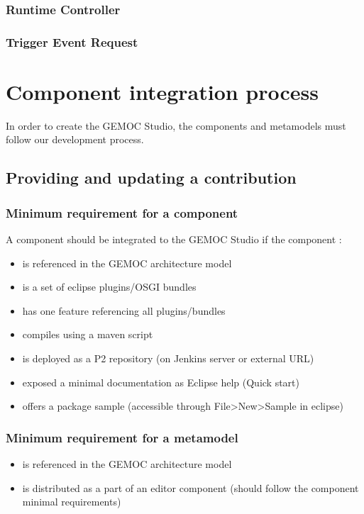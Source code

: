 \documentclass{gemoc} %
\begin{document}

\subsection{Runtime Controller}
\label{sec:Runtime_Controller}


\subsection{Trigger Event Request}
\label{sec:Trigger_Event_Request}



\chapter{Component integration process}
In  order to create the GEMOC Studio, the components and metamodels must follow our development process.

\section{Providing and updating a contribution}
\subsection{Minimum requirement for a component}
A component should be integrated to the GEMOC Studio if the component :
\begin{itemize}
	\item is referenced in the GEMOC architecture model
	\item is a set of eclipse plugins/OSGI bundles
	\item has one feature referencing all plugins/bundles
	\item compiles using a maven script
	\item is deployed as a P2 repository (on Jenkins server or external URL)
	\item exposed a minimal documentation as Eclipse help (Quick start)
	\item offers a package sample (accessible through File>New>Sample in eclipse)
\end{itemize}
\subsection{Minimum requirement for a metamodel}
\begin{itemize}
	\item is referenced in the GEMOC architecture model
	\item is distributed as a part of an editor component (should follow the component minimal requirements)
\end{itemize}
\end{document}
